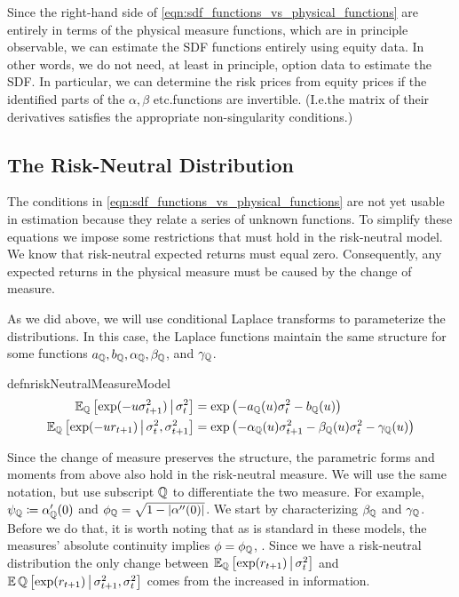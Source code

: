 \documentclass[11pt, letterpaper, twoside, final]{article}
\begin{document}
Since the right-hand side of \cref{eqn:sdf_functions_vs_physical_functions} are entirely in terms of the physical
measure functions, which are in principle observable, we can estimate the SDF functions entirely using equity
data.
In other words, we do not need, at least in principle, option data to estimate the SDF.
In particular, we can determine the risk prices from equity prices if the identified parts of the $\alpha,
\beta$ etc.\@ functions are  invertible.
(I.e.\@ the matrix of their derivatives satisfies the appropriate non-singularity conditions.)

\subsection{The Risk-Neutral Distribution}

The conditions in \cref{eqn:sdf_functions_vs_physical_functions} are not yet usable in estimation because they
relate a series of unknown functions.
To simplify these equations we impose some restrictions that must hold in the risk-neutral model. 
We know that risk-neutral expected returns must equal zero.
Consequently, any expected returns in the physical measure must be caused by the change of measure.

As we did above, we will use conditional Laplace transforms to parameterize the distributions.
In this case, the Laplace functions maintain the same structure for some functions $a_{\QQ}, b_{\QQ},
\alpha_{\QQ}, \beta_{\QQ}$, and $\gamma_{\QQ}$.

\begin{restatable}{defn}{riskNeutralMeasureModel}
    \label{defn:risk_neutral_model}
    \begin{align}
        \E_{\QQ} \left[\exp(-u \sigma^2_{t+1}) \mvert \sigma^2_t \right] &= \exp\left( - a_{\QQ}(u) \sigma^2_t -
        b_{\QQ}(u) \right) \\
        \E_{\QQ}\left[\exp(-u r_{t+1}) \mvert \sigma^2_t,  \sigma^2_{t+1}\right] &= \exp\left(- \alpha_{\QQ}(u)
        \sigma^2_{t+1} - \beta_{\QQ}(u)\sigma^2_t - \gamma_{\QQ}(u) \right) 
    \end{align}
\end{restatable}


Since the change of measure preserves the structure, the parametric forms and moments from above also hold in the
risk-neutral measure.
We will use the same notation, but use subscript $\QQ$ to differentiate the two measure. 
For example, $\psi_{\QQ} \coloneqq \alpha_{\QQ}'(0)$ and $\phi_{\QQ} = \sqrt{1 - \abs*{\alpha''(0)}}$.
We start by characterizing $\beta_{\QQ}$ and $\gamma_{\QQ}$.
Before we do that, it is worth noting that as is standard in these models, the measures' absolute continuity
implies $\phi = \phi_{\QQ}$, \parencite[17]{khrapov2016affine}.
Since we have a risk-neutral distribution the only change between $\E_{\QQ}\left[\exp(r_{t+1}) \mvert
\sigma^2_t\right]$ and $\E{\QQ}\left[\exp(r_{t+1}) \mvert \sigma^2_{t+1}, \sigma^2_t\right]$ comes from the
increased in information.
\end{document}
